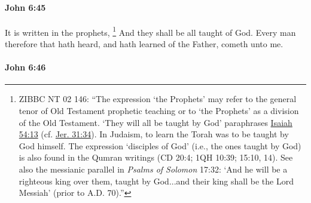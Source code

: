 		\paragraph{John 6:45} %
			\label{JOHN-6-45}

			It is written in the prophets,%
				\footnote{%
					ZIBBC NT 02 146: ``The expression `the Prophets' may refer to the general tenor of Old Testament prophetic teaching or to `the Prophets' as a division of the Old Testament. `They will all be taught by God' paraphrases \hyperref[ISAIAH-54-13]{Isaiah 54:13} (cf. \hyperref[JEREMIAH-31-34]{Jer. 31:34}). In Judaism, to learn the Torah was to be taught by God himself. The expression `disciples of God' (i.e., the ones taught by God) is also found in the Qumran writings (CD 20:4; 1QH 10:39; 15:10, 14). See also the messianic parallel in \textit{Psalms of Solomon} 17:32: `And he will be a righteous king over them, taught by God...and their king shall be the Lord Messiah' (prior to A.D. 70).''
					}
			And they shall be all taught of God. Every man therefore that hath heard, and hath learned of the Father, cometh unto me.

			\begin{framed}
			\scriptsize
				\begin{compactdesc}
					\item[SBLG] 
				\end{compactdesc}
			\end{framed}

		\paragraph{John 6:46} %
			\label{JOHN-6-46}


